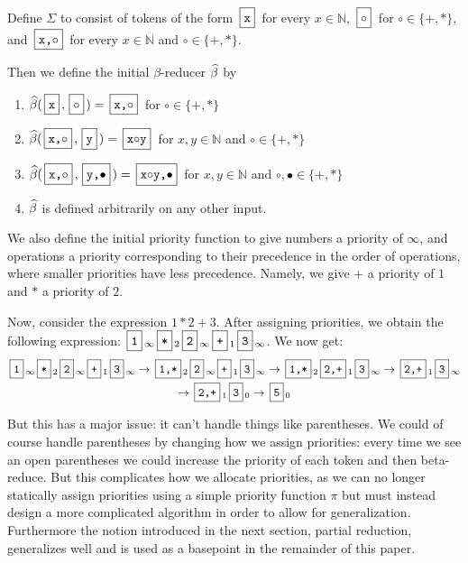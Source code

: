 \documentclass{llncs}
\newcounter{algo}
\begin{document}
\begin{example}

    Define $\Sigma$ to consist of tokens of the form $\mbt{x}$ for every $x\in\mathbb{N}$, $\mb\circ$ for $\circ\in\{+,*\}$, and $\mbt{x,$\circ$}$ for every $x\in\mathbb{N}$
    and $\circ\in\{+,*\}$.
    
    Then we define the initial $\beta$-reducer $\widehat\beta$ by
    \begin{enumerate}
        \item $\hb(\mbt x,\mb\circ)=\mbt{x,$\circ$}$ for $\circ\in\{+,*\}$
        \item $\hb(\mbt{x,$\circ$},\mbt y)=\mbt{x$\circ$y}$ for 
        $x,y\in\mathbb{N}$ and $\circ\in\{+,*\}$
        \item $\hb(\mbt{x,$\circ$},\mbt{y,$\bullet$})=\mbt{x$\circ$y,$\bullet$}$ 
        for $x,y\in\mathbb{N}$ and $\circ,\bullet\in\{+,*\}$
        \item $\widehat\beta$ is defined arbitrarily on any other input.
    \end{enumerate}
    
    We also define the initial priority function to give numbers a priority of $\infty$, and operations a priority corresponding to their precedence in the order of operations,
    where smaller priorities have less precedence.
    Namely, we give $+$ a priority of $1$ and $*$ a priority of $2$.
    
    Now, consider the expression $1*2+3$. 
    After assigning priorities, we obtain the following expression:
    $\mbt1_\infty \mbt*_2 \mbt2_\infty \mbt+_1 \mbt3_\infty$.
    We now get:
    \begin{multline*}
        \mbt1_\infty \mbt*_2 \mbt2_\infty \mbt+_1 \mbt3_\infty \to \mbt{1,*}_2 \mbt2_\infty \mbt+_1 \mbt3_\infty \to \mbt{1,*}_2 \mbt{2,+}_1 \mbt3_\infty \to \mbt{2,+}_1 \mbt3_\infty\\
        \to \mbt{2,+}_1 \mbt3_0 \to \mbt5_0
    \end{multline*}

\end{example}

But this has a major issue: it can't handle things like parentheses.
We could of course handle parentheses by changing how we assign priorities: every time we see an open parentheses we could increase
the priority of each token and then beta-reduce.
But this complicates how we allocate priorities, as we can no longer statically assign priorities using a simple priority function $\pi$ but must instead design a more complicated algorithm in order
to allow for generalization.
Furthermore the notion introduced in the next section, partial reduction, generalizes well and is used as a basepoint in the
remainder of this paper.
\end{document}
